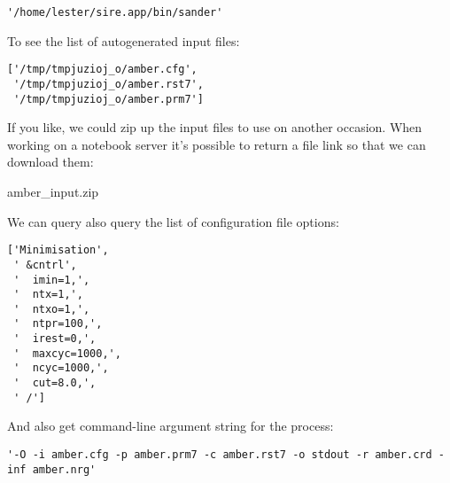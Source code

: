 \begin{verbatim}
'/home/lester/sire.app/bin/sander'
\end{verbatim}

To see the list of autogenerated input files:

\begin{Shaded}
\begin{Highlighting}[]
\end{Highlighting}
\end{Shaded}

\begin{verbatim}
['/tmp/tmpjuzioj_o/amber.cfg',
 '/tmp/tmpjuzioj_o/amber.rst7',
 '/tmp/tmpjuzioj_o/amber.prm7']
\end{verbatim}

If you like, we could zip up the input files to use on another occasion.
When working on a notebook server it's possible to return a file link so
that we can download them:

\begin{Shaded}
\begin{Highlighting}[]
\OperatorTok{=}\NormalTok{)}
\end{Highlighting}
\end{Shaded}

amber\_input.zip

We can query also query the list of configuration file options:

\begin{Shaded}
\begin{Highlighting}[]
\end{Highlighting}
\end{Shaded}

\begin{verbatim}
['Minimisation',
 ' &cntrl',
 '  imin=1,',
 '  ntx=1,',
 '  ntxo=1,',
 '  ntpr=100,',
 '  irest=0,',
 '  maxcyc=1000,',
 '  ncyc=1000,',
 '  cut=8.0,',
 ' /']
\end{verbatim}

And also get command-line argument string for the process:

\begin{Shaded}
\begin{Highlighting}[]
\end{Highlighting}
\end{Shaded}

\begin{verbatim}
'-O -i amber.cfg -p amber.prm7 -c amber.rst7 -o stdout -r amber.crd -inf amber.nrg'
\end{verbatim}

